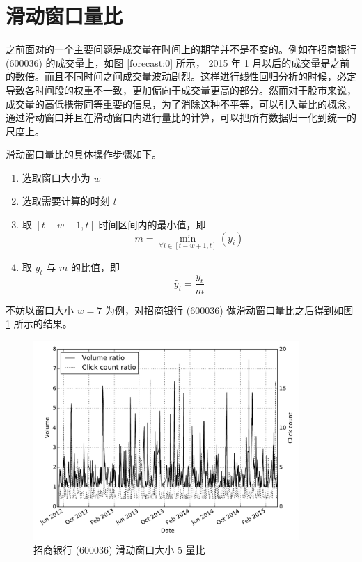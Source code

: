 \section{滑动窗口量比}

之前面对的一个主要问题是成交量在时间上的期望并不是不变的。例如在招商银行 (600036) 的成交量上，如图 \ref{forecast:0} 所示， 2015 年 1 月以后的成交量是之前的数倍。而且不同时间之间成交量波动剧烈。这样进行线性回归分析的时候，必定导致各时间段的权重不一致，更加偏向于成交量更高的部分。然而对于股市来说，成交量的高低携带同等重要的信息，为了消除这种不平等，可以引入量比的概念，通过滑动窗口并且在滑动窗口内进行量比的计算，可以把所有数据归一化到统一的尺度上。

滑动窗口量比的具体操作步骤如下。

\begin{enumerate}
  \item 选取窗口大小为 $w$
  \item 选取需要计算的时刻 $t$
  \item 取 $[t-w+1,t]$ 时间区间内的最小值，即
    \[
      m=\min_{\forall i\in [t-w+1,t]}\left(y_{i}\right)
    \]
  \item 取 $y_{t}$ 与 $m$ 的比值，即
    \[
      \hat{y}_{t}=\frac{y_{t}}{m}
    \]
\end{enumerate}

不妨以窗口大小 $w=7$ 为例，对招商银行 (600036) 做滑动窗口量比之后得到如图 \ref{sliding_window:0} 所示的结果。

\begin{figure}
  \centering
  \includegraphics[width=0.9\textwidth]{plots/sliding_ratio_line.pdf}
  \caption{招商银行 (600036) 滑动窗口大小 $5$ 量比}
  \label{sliding_window:0}
\end{figure}


